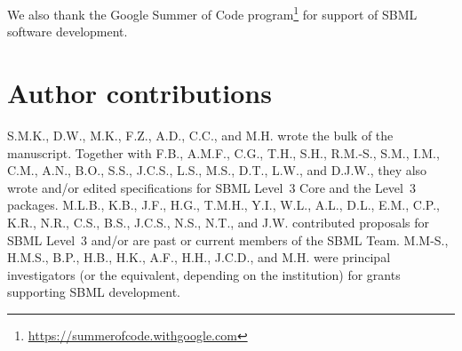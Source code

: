 \documentclass{sbml-paper}
\begin{document}
We also thank the Google Summer of Code program\footnote{\url{https://summerofcode.withgoogle.com}} for support of SBML software development.


\section*{Author contributions}

S.M.K., D.W., M.K., F.Z., A.D., C.C., and M.H. wrote the bulk of the manuscript.  Together with F.B., A.M.F., C.G., T.H., S.H., R.M.-S., S.M., I.M., C.M., A.N., B.O., S.S., J.C.S., L.S., M.S., D.T., L.W., and D.J.W., they also wrote and/or edited specifications for SBML Level~3 Core and the Level~3 packages.  M.L.B., K.B., J.F., H.G., T.M.H., Y.I., W.L., A.L., D.L., E.M., C.P., K.R., N.R., C.S., B.S., J.C.S., N.S., N.T., and J.W. contributed proposals for SBML Level~3 and/or are past or current members of the SBML Team.  M.M-S., H.M.S., B.P., H.B., H.K., A.F., H.H., J.C.D., and M.H. were principal investigators (or the equivalent, depending on the institution) for grants supporting SBML development.



\clearpage



\end{document}
